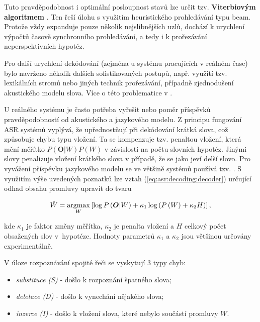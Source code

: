 \noindent Tuto pravděpodobnost i optimální posloupnost stavů lze určit tzv. \textbf{Viterbiovým algoritmem} \cite{Holmes2001}. Ten řeší úlohu s využitím heuristického prohledávání typu beam. Protože vždy expanduje pouze několik nejslibnějších uzlů, dochází k urychlení výpočtů časově synchronního prohledávání, a tedy i k prořezávání neperspektivních hypotéz.

Pro další urychlení dekódování (zejména u systému pracujících v reálném čase) bylo navrženo několik dalších sofistikovaných postupů, např. využití tzv. lexikálních stromů nebo jiných technik prořezávání, případně zjednodušení akustického modelu slova. Více o této problematice v \cite{Psutka2006}.

U reálného systému je často potřeba vyřešit nebo  poměr příspěvků pravděpodobností od akustického a jazykového modelu. Z principu fungování ASR systémů vyplývá, že upřednostňují při dekódování krátká slova, což způsobuje chybu typu vložení. Ta se kompenzuje tzv. penaltou vložení, která mění měřítko $P(\boldsymbol{O}|W)P(W)$ v závislosti na počtu slovních hypotéz. Jinými slovy penalizuje vložení krátkého slova v případě, že se jako  jeví delší slovo. Pro vyvážení příspěvku jazykového modelu se ve většině systémů používá tzv. . S využitím výše uvedených poznatků lze vztah (\ref{eq:asr:decoding:decoder}) určující odhad obsahu promluvy upravit do tvaru

\begin{equation}
  \hat{W} = \operatorname*{argmax}_{W} \left[\log P\left(\boldsymbol{O}|W\right) + \kappa_1 \log\left(P\left(W\right) + \kappa_2H\right)\right],
  \label{eq:asr:decoding:compensated}
\end{equation}

\noindent kde $\kappa_1$ je faktor změny měřítka, $\kappa_2$ je penalta vložení a $H$ celkový počet obsažených slov v~hypotéze. Hodnoty parametrů $\kappa_1$ a $\kappa_2$ jsou většinou určovány experimentálně.

V úloze rozpoznávání spojité řeči se vyskytují 3 typy chyb:

\begin{itemize}
  \item \textit{substituce (S)} - došlo k rozpoznání špatného slova;
  \item \textit{deletace (D)} - došlo k vynechání nějakého slova;
  \item \textit{inzerce (I)} - došlo k vložení slova, které nebylo součástí promluvy $W$.
\end{itemize}

